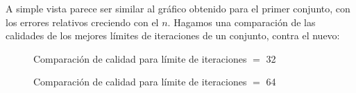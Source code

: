 A simple vista parece ser similar al gráfico obtenido para el primer conjunto, con los errores relativos creciendo con el $n$. Hagamos una comparación de las calidades de los mejores límites de iteraciones de un conjunto, contra el nuevo:

\begin{figure}[H]
	\begin{minipage}[t]{0.5\linewidth}
		\centering
		\caption{Comparación de calidad para límite de iteraciones $=$ 32}
		\label{fig:ejercicio-6-calidad-comparacion-n-32}
	\end{minipage}
	\begin{minipage}[t]{0.5\linewidth}
		\centering
		\caption{Comparación de calidad para límite de iteraciones $=$ 64}
		\label{fig:ejercicio-6-calidad-comparacion-n-64}
	\end{minipage}
\end{figure}

